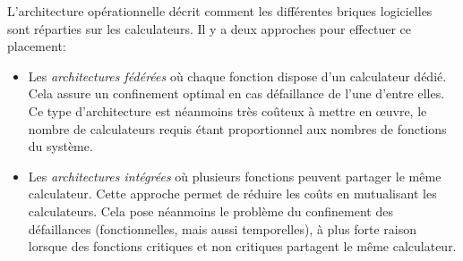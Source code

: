 L'architecture opérationnelle décrit comment les différentes briques logicielles sont réparties sur les calculateurs.
Il y a deux approches pour effectuer ce placement:
\begin{itemize}
	\item Les \emph{architectures fédérées} où chaque fonction dispose d'un calculateur dédié.
	Cela assure un confinement optimal en cas défaillance de l'une d'entre elles.
	Ce type d'architecture est néanmoins très coûteux à mettre en œuvre, le nombre de calculateurs requis étant proportionnel aux nombres de fonctions du système.

	\item Les \emph{architectures intégrées} où plusieurs fonctions peuvent partager le même calculateur.
	Cette approche permet de réduire les coûts en mutualisant les calculateurs.
	Cela pose néanmoins le problème du confinement des défaillances (fonctionnelles, mais aussi temporelles), à plus forte raison lorsque des fonctions critiques et non critiques partagent le même calculateur.
\end{itemize}

